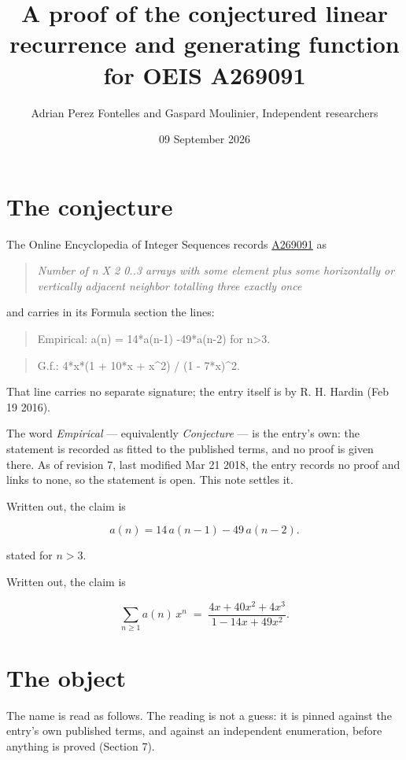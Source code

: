 \documentclass[11pt]{article}
\title{A proof of the conjectured linear recurrence and generating function for OEIS A269091}
\author{Adrian Perez Fontelles and Gaspard Moulinier, Independent researchers}
\date{09 September 2026}
\theoremstyle{definition}
\begin{document}
\maketitle
\section{The conjecture}

The Online Encyclopedia of Integer Sequences records \href{https://oeis.org/A269091}{A269091} as

\begin{quote}\itshape Number of n X 2 0..3 arrays with some element plus some horizontally or vertically adjacent neighbor totalling three exactly once\end{quote}

and carries in its Formula section the lines:

\begin{quote}\ttfamily Empirical: a(n) = 14*a(n-1) -49*a(n-2) for n>3.\end{quote}

\begin{quote}\ttfamily G.f.: 4*x*(1 + 10*x + x\textasciicircum{}2) / (1 - 7*x)\textasciicircum{}2.\end{quote}

That line carries no separate signature; the entry itself is by R. H. Hardin (Feb 19 2016).

The word {\itshape Empirical} --- equivalently {\itshape Conjecture} --- is the entry's own: the statement is recorded as fitted to the published terms, and no proof is given there. As of revision 7, last modified Mar 21 2018, the entry records no proof and links to none, so the statement is open. This note settles it.

Written out, the claim is

\[a(n) = 14\,a(n-1) - 49\,a(n-2).\]

stated for $n > 3$.

Written out, the claim is

\[\sum_{n \ge 1} a(n)\,x^n \;=\; \frac{4x + 40x^{2} + 4x^{3}}{1 - 14x + 49x^{2}}.\]

\section{The object}

The name is read as follows. The reading is not a guess: it is pinned against the entry's own published terms, and against an independent enumeration, before anything is proved (Section 7).
\end{document}
